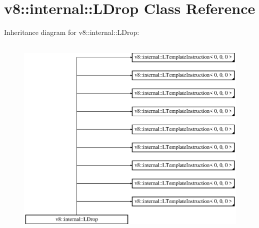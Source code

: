 \hypertarget{classv8_1_1internal_1_1_l_drop}{}\section{v8\+:\+:internal\+:\+:L\+Drop Class Reference}
\label{classv8_1_1internal_1_1_l_drop}
Inheritance diagram for v8\+:\+:internal\+:\+:L\+Drop\+:\begin{figure}[H]
\begin{center}
\leavevmode
\includegraphics[height=10.000000cm]{classv8_1_1internal_1_1_l_drop}
\end{center}
\end{figure}
